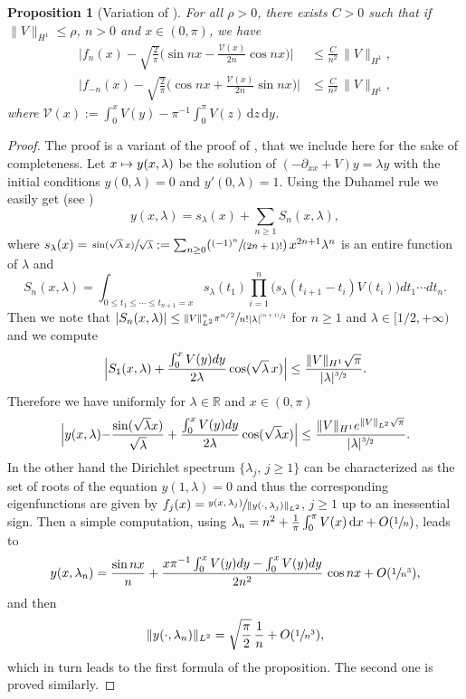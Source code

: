 \documentclass[JEP,XML,SOM,Unicode,NoEqCountersInSection,published]{cedram}
\newcommand\mto{\mathchoice{\longmapsto}{\mapsto}{\mapsto}{\mapsto}}
\newcommand{\Psfrac}[2]{(\sfrac{#1}{#2})}
\newcommand{\psfrac}[2]{\sfrac{(#1)}{#2}}
\newtheorem{proposition}[theorem]{Proposition}
\theoremstyle{definition}
\begin{document}
\begin{proposition}[Variation of {\cite[Th.\,4, p.\,16]{PT}}] \label{prop_desc_fn}
For all $\rho>0$, there exists $C>0$ such that if $\|V\|_{H^1}\leq \rho$, $n>0$ and $x\in (0,\pi)$, we have
\begin{align*}
\biggl|f_n(x)-\sqrt{\frac2\pi}\Big(\sin nx- \frac{\mathcal{V}(x)}{2n}\cos nx \Big)\biggr|&\leq \frac C{n^2}\,\|V\|_{H^1},
\\
\biggl|f_{-n}(x)-\sqrt{\frac2\pi}\Big(\cos nx+\frac{\mathcal{V}(x)}{2n}\sin nx \Big)\biggr|&\leq \frac C{n^2}\,\|V\|_{H^1},
\end{align*}
where $\mathcal{V}(x):= \int_0^x V(y) - \pi^{-1}\int_0^\pi V(z) \,\mathrm{d}z\, \mathrm{d}y$.
\end{proposition}
\begin{proof}
The proof is a variant of the proof of \cite[Th.\,4, p.\,16]{PT}, that we include here for the sake of completeness. Let $x\mto y(x,\lambda)$ be the solution of $(-\partial_{xx}+V)y=\lambda y$ with the initial conditions $y(0,\lambda)=0$ and $y'(0,\lambda)=1$.
Using the Duhamel rule we easily get (see \cite[Th.\,1, p.\,7]{PT})
\[
y(x,\lambda)=s_\lambda(x)+\sum_{n\geq1}S_n(x,\lambda),
\]
where $s_\lambda(x)=\sfrac{\sin(\sqrt\lambda\, x)}{\sqrt \lambda}:=\sum_{n\geq0}\Psfrac{(-1)^n}{(2n+1)!}\,x^{2n+1}\lambda^n$ is an entire function of $\lambda$ and
\[
S_n(x,\lambda)=\int_{0\leq t_1\leq\cdots\leq t_{n+1}=x}s_\lambda(t_1)\prod_{i=1}^n\big(s_\lambda(t_{i+1}-t_i)V(t_i)\big)dt_1\cdots dt_n.
\]
Then we note that $ |S_n(x,\lambda)|\leq \sfrac{\|V\|^n_{L^2} { \pi^{n/2} }}{n!|\lambda|^{\psfrac{n+1}{2}}}$ for $n\geq 1$ {and $\lambda\in[1/2,+\infty)$}
and we compute
\[
\Bigl|S_1(x,\lambda)+\frac{ \int_0^x V(y)dy}{2\lambda}\cos(\sqrt\lambda\, x)\Bigr|\leq \frac{\|V\|_{H^1}\sqrt\pi}{|\lambda|^{\sfrac32}}.
\]
Therefore we have uniformly for $\lambda\in\mathbb R$ and $x\in(0,\pi)$
\[
\Bigl|y(x,\lambda){ -\frac{\sin(\sqrt{\lambda} x)}{\sqrt{\lambda}} }+ \frac{ \int_0^x V(y)dy}{2\lambda}\cos (\sqrt\lambda x)\Bigr|\leq \frac{\|V\|_{H^1}e^{\|V\|_{L^2} { \sqrt{\pi} } }}{|\lambda|^{\sfrac32}}.
\]
In the other hand the Dirichlet spectrum $\{\lambda_j,\, j\geq1\}$ can be characterized as the set of roots of the equation $y(1,\lambda)=0$ and thus
the corresponding eigenfunctions are given by $f_j(x)=\sfrac{y(x,\lambda_j)}{\|y(\cdot,\lambda_j)\|_{L^2}}$, $j\geq1$ up to an inessential sign. Then a simple computation, using $\lambda_n = n^2 + \frac1\pi \int_{0}^{\pi} V(x)\, \mathrm{d}x + O(\sfrac1n)$, leads to
\[
y(x,\lambda_n)=\frac{\sin nx}{n}+ \frac{x\pi^{-1}\int_0^x V(y)dy-\int_0^x V(y)dy}{2n^2}\,\cos nx+O(\sfrac 1{n^3}),
\]
and then
\[
\|y(\cdot,\lambda_n)\|_{L^2}= \sqrt{\frac\pi 2}\,\frac1n+O(\sfrac1{n^3}),
\]
which in turn leads to the first formula of the proposition. The second one is proved similarly.
\end{proof}
\end{document}
